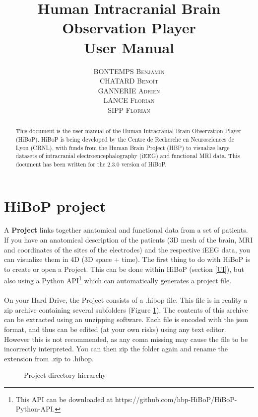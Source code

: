 \documentclass[a4paper]{article}
\title{Human Intracranial Brain Observation Player \\ User Manual}
\author{\textsc{BONTEMPS Benjamin} \\ \textsc{CHATARD Benoît} \\ \textsc{GANNERIE Adrien} \\ \textsc{LANCE Florian} \\ \textsc{SIPP Florian}}
\begin{document}
\maketitle
\begin{abstract}
This document is the user manual of the Human Intracranial Brain Observation Player (HiBoP). HiBoP is being developed by the Centre de Recherche en Neurosciences de Lyon (CRNL), with funds from the Human Brain Project (HBP) to visualize large datasets of intracranial electroencephalography (iEEG) and functional MRI data. This document has been written for the 2.3.0 version of HiBoP.
\end{abstract}
\tableofcontents
\section{HiBoP project} \label{data}
\paragraph{} A \textbf{Project} links together anatomical and functional data from a set of patients. If you have an anatomical description of the patients (3D mesh of the brain, MRI and coordinates of the sites of the electrodes) and the respective iEEG data, you can visualize them in 4D (3D space + time). The first thing to do with HiBoP is to create or open a Project. This can be done within HiBoP (section \ref{UI}), but also using a Python API\footnote{This API can be downloaded at https://github.com/hbp-HiBoP/HiBoP-Python-API.} which can automatically generates a project file.
\paragraph{} On your Hard Drive, the Project consists of a .hibop file. This file is in reality a zip archive containing several subfolders (Figure \ref{projectDirectory}). The contents of this archive can be extracted using an unzipping software. Each file is encoded with the json format, and thus can be edited (at your own risks) using any text editor. However this is not recommended, as any coma missing may cause the file to be incorrectly interpreted. You can then zip the folder again and rename the extension from .zip to .hibop.
\begin{figure}[H]
\caption{\label{projectDirectory}Project directory hierarchy}
\end{figure}
\end{document}
